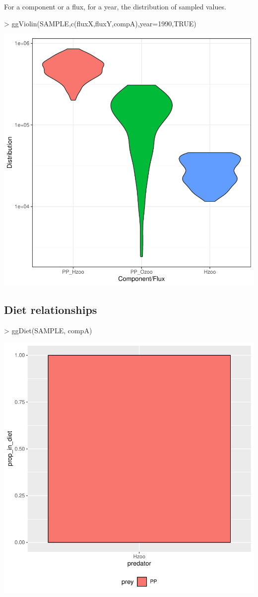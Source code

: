 \documentclass{article}
\begin{document}
For a component or a flux, for a year, the distribution of sampled values. 
\begin{Schunk}
\begin{Sinput}
> ggViolin(SAMPLE,c(fluxX,fluxY,compA),year=1990,TRUE)
\end{Sinput}
\end{Schunk}
\includegraphics{barents_SM-018}


\clearpage

\subsection{Diet relationships}

\begin{Schunk}
\begin{Sinput}
> ggDiet(SAMPLE, compA)
\end{Sinput}
\end{Schunk}
\includegraphics{barents_SM-019}
\end{document}

